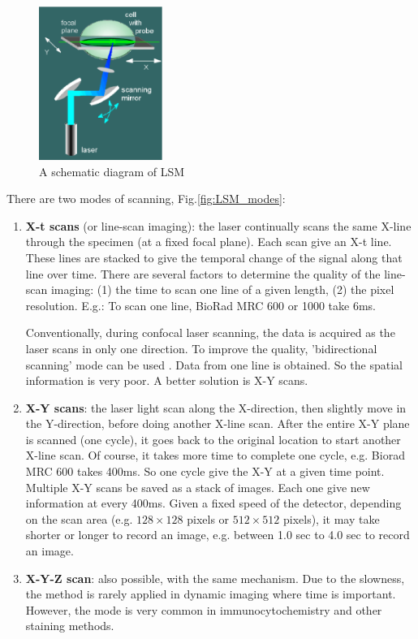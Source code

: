\begin{figure}[hbt]
  \centerline{\includegraphics[height=5cm,
  angle=0]{./images/LSM_diagram.eps}}
  \caption{A schematic diagram of LSM}
  \label{fig:LSM_diagram}
\end{figure}

There are two modes of scanning, Fig.\ref{fig:LSM_modes}:
\begin{enumerate}
  \item {\bf X-t scans} (or line-scan imaging): the laser continually scans the
  same X-line through the specimen (at a fixed focal plane). Each scan give an 
 X-t line. These lines are stacked to give the temporal change of the signal
 along that line over time. There are several factors to determine the quality
 of the line-scan imaging: (1) the time to scan one line of a given length, (2)
 the pixel resolution. E.g.: To scan one line, BioRad MRC 600 or 1000 take 6ms.
 
 Conventionally, during confocal laser scanning, the data is acquired as the
 laser scans in only one direction. To improve the quality, 'bidirectional
 scanning' mode can be used \citep{hallett1999}. Data from one line is obtained.
 So the spatial information is very poor. 
 A better solution is X-Y scans.
 
  \item {\bf X-Y scans}: the laser light scan along the X-direction, then
  slightly move in the Y-direction, before doing another X-line scan. After the
  entire X-Y plane is scanned (one cycle), it goes back to the original location
  to start another X-line scan. Of course, it takes more time to complete one
  cycle, e.g. Biorad MRC 600 takes 400ms. So one cycle give the X-Y at a given
  time point. Multiple X-Y scans be saved as a stack of images. Each one give
  new information at every 400ms. Given a fixed speed of the detector, depending on the scan
  area (e.g. $128\times 128$ pixels or $512\times 512$ pixels), it may take
  shorter or longer to record an image, e.g. between 1.0 sec to 4.0 sec to
  record an image.
   
  \item {\bf X-Y-Z scan}: also possible, with the same mechanism. Due to the
  slowness, the method is rarely applied in dynamic imaging where time is
  important. However, the mode is very common in immunocytochemistry and other
  staining methods.
  
\end{enumerate}

